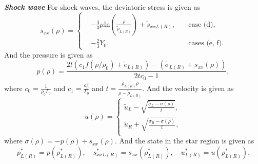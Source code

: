 \documentclass{article}
\numberwithin{equation}{section}
\numberwithin{table}{section}
\begin{document}
\emph{\textbf{Shock wave}}
For shock waves, the  deviatoric stress is given as
\begin{equation}
s_{xx}(\rho) = \left\{\begin{aligned}
	  & -\frac{4}{3}\mu\text{ln}\left(\frac{\rho}{\tilde{\rho}_{L(R)}}\right)+\tilde{s}_{xxL(R)},
	\quad  &\text{case (d)},\\
	& -\frac{2}{3}Y_0,   \quad
	&\text{cases (e, f)}.
  \end{aligned} \right.
  \end{equation}
And the pressure is given as
\begin{equation}
  p(\rho)=
  \frac{2t(c_1f(\rho/\rho_0)+\tilde{e}_{L(R)})-(\tilde{\sigma}_{L(R)}+{s}_{xx}(\rho))}{2tc_0-1},
\end{equation}
where $c_0 = \frac{1}{\rho_0\Gamma_0}$ and $c_1 = \frac{a_0^2}{\Gamma_0}$ and $ t=\frac{\tilde{\rho}_{L(R)} \rho}{\rho-\tilde{\rho}_{L(R)}}$.
And the velocity is given as
\begin{equation}
  u(\rho)= \left\{ \begin{array}{l}
	  \tilde{u}_L -\sqrt{\frac{\tilde{\sigma}_L-\sigma(\rho)}{t}},\\
	  \tilde{u}_R +\sqrt{\frac{\tilde{\sigma}_R-\sigma(\rho)}{t}},\\
  \end{array}
\right.
\end{equation}
where $\sigma(\rho) = -p(\rho)+s_{xx}(\rho)$. And the state in  the star region is given as
\begin{equation}
  p^*_{L(R)} = p(\rho_{L(R)}^*),\quad s_{xxL(R)}^* = s_{xx}(\rho_{L(R)}^*),\quad  u^*_{L(R)} = u(\rho_{L(R)}^*).
\end{equation}
\end{document}
